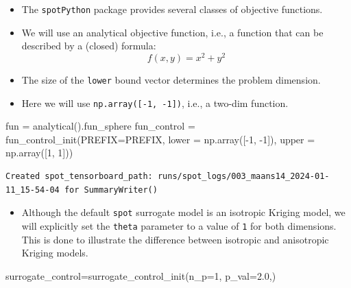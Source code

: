 \documentclass[
  letterpaper,
  DIV=11,
  numbers=noendperiod]{scrreprt}
\newenvironment{Shaded}{\begin{snugshade}}{\end{snugshade}}
\newcommand{\DecValTok}[1]{\textcolor[rgb]{0.68,0.00,0.00}{#1}}
\newcommand{\FloatTok}[1]{\textcolor[rgb]{0.68,0.00,0.00}{#1}}
\newcommand{\NormalTok}[1]{\textcolor[rgb]{0.00,0.23,0.31}{#1}}
\newcommand{\OperatorTok}[1]{\textcolor[rgb]{0.37,0.37,0.37}{#1}}
\providecommand{\tightlist}{%
  \setlength{\itemsep}{0pt}\setlength{\parskip}{0pt}}\usepackage{longtable,booktabs,array}
\begin{document}
\begin{itemize}
\tightlist
\item
  The \texttt{spotPython} package provides several classes of objective
  functions.
\item
  We will use an analytical objective function, i.e., a function that
  can be described by a (closed) formula: \[f(x, y) = x^2 + y^2\]
\item
  The size of the \texttt{lower} bound vector determines the problem
  dimension.
\item
  Here we will use \texttt{np.array({[}-1,\ -1{]})}, i.e., a two-dim
  function.
\end{itemize}

\begin{Shaded}
\begin{Highlighting}[]
\NormalTok{fun }\OperatorTok{=}\NormalTok{ analytical().fun\_sphere}
\NormalTok{fun\_control }\OperatorTok{=}\NormalTok{ fun\_control\_init(PREFIX}\OperatorTok{=}\NormalTok{PREFIX,}
\NormalTok{                               lower }\OperatorTok{=}\NormalTok{ np.array([}\OperatorTok{{-}}\DecValTok{1}\NormalTok{, }\OperatorTok{{-}}\DecValTok{1}\NormalTok{]),}
\NormalTok{                               upper }\OperatorTok{=}\NormalTok{ np.array([}\DecValTok{1}\NormalTok{, }\DecValTok{1}\NormalTok{]))}
\end{Highlighting}
\end{Shaded}

\begin{verbatim}
Created spot_tensorboard_path: runs/spot_logs/003_maans14_2024-01-11_15-54-04 for SummaryWriter()
\end{verbatim}

\begin{itemize}
\tightlist
\item
  Although the default \texttt{spot} surrogate model is an isotropic
  Kriging model, we will explicitly set the \texttt{theta} parameter to
  a value of \texttt{1} for both dimensions. This is done to illustrate
  the difference between isotropic and anisotropic Kriging models.
\end{itemize}

\begin{Shaded}
\begin{Highlighting}[]
\NormalTok{surrogate\_control}\OperatorTok{=}\NormalTok{surrogate\_control\_init(n\_p}\OperatorTok{=}\DecValTok{1}\NormalTok{,}
\NormalTok{                                         p\_val}\OperatorTok{=}\FloatTok{2.0}\NormalTok{,)}
\end{Highlighting}
\end{Shaded}
\end{document}
